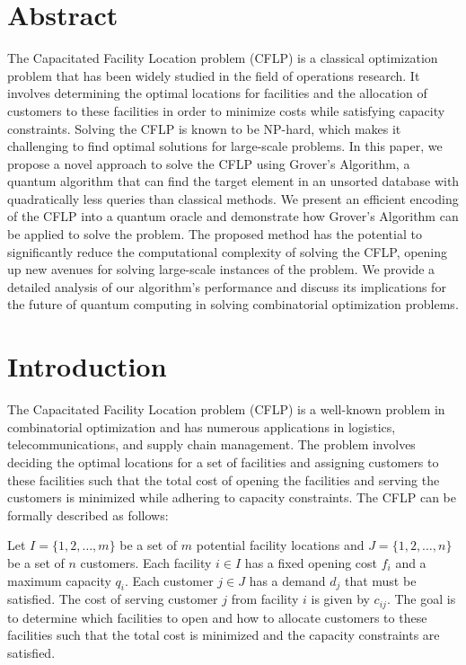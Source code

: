 \section{Abstract}

The Capacitated Facility Location problem (CFLP) is a classical optimization problem that has been widely studied in the field of operations research. It involves determining the optimal locations for facilities and the allocation of customers to these facilities in order to minimize costs while satisfying capacity constraints. Solving the CFLP is known to be NP-hard, which makes it challenging to find optimal solutions for large-scale problems. In this paper, we propose a novel approach to solve the CFLP using Grover's Algorithm, a quantum algorithm that can find the target element in an unsorted database with quadratically less queries than classical methods. We present an efficient encoding of the CFLP into a quantum oracle and demonstrate how Grover's Algorithm can be applied to solve the problem. The proposed method has the potential to significantly reduce the computational complexity of solving the CFLP, opening up new avenues for solving large-scale instances of the problem. We provide a detailed analysis of our algorithm's performance and discuss its implications for the future of quantum computing in solving combinatorial optimization problems.

\section{Introduction}

The Capacitated Facility Location problem (CFLP) is a well-known problem in combinatorial optimization and has numerous applications in logistics, telecommunications, and supply chain management. The problem involves deciding the optimal locations for a set of facilities and assigning customers to these facilities such that the total cost of opening the facilities and serving the customers is minimized while adhering to capacity constraints. The CFLP can be formally described as follows:

Let $I = \{1, 2, \dots, m\}$ be a set of $m$ potential facility locations and $J = \{1, 2, \dots, n\}$ be a set of $n$ customers. Each facility $i \in I$ has a fixed opening cost $f_i$ and a maximum capacity $q_i$. Each customer $j \in J$ has a demand $d_j$ that must be satisfied. The cost of serving customer $j$ from facility $i$ is given by $c_{ij}$. The goal is to determine which facilities to open and how to allocate customers to these facilities such that the total cost is minimized and the capacity constraints are satisfied.

